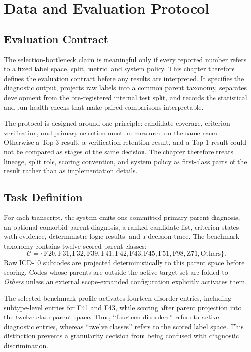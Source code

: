 \chapter{Data and Evaluation Protocol}
\label{ch:data}

\section{Evaluation Contract}

The selection-bottleneck claim is meaningful only if every reported number refers to a fixed label space, split, metric, and system policy. This chapter therefore defines the evaluation contract before any results are interpreted. It specifies the diagnostic output, projects raw labels into a common parent taxonomy, separates development from the pre-registered internal test split, and records the statistical and run-health checks that make paired comparisons interpretable.

The protocol is designed around one principle: candidate coverage, criterion verification, and primary selection must be measured on the same cases. Otherwise a Top-3 result, a verification-retention result, and a Top-1 result could not be compared as stages of the same decision. The chapter therefore treats lineage, split role, scoring convention, and system policy as first-class parts of the result rather than as implementation details.

\section{Task Definition}

For each transcript, the system emits one committed primary parent diagnosis, an optional comorbid parent diagnosis, a ranked candidate list, criterion states with evidence, deterministic logic results, and a decision trace. The benchmark taxonomy contains twelve scored parent classes:
\[
\mathcal{C}=\{\mathrm{F20},\mathrm{F31},\mathrm{F32},\mathrm{F39},\mathrm{F41},
\mathrm{F42},\mathrm{F43},\mathrm{F45},\mathrm{F51},\mathrm{F98},
\mathrm{Z71},\mathrm{Others}\}.
\]
Raw ICD-10 subcodes are projected deterministically to this parent space before scoring. Codes whose parents are outside the active target set are folded to \emph{Others} unless an external scope-expanded configuration explicitly activates them.

The selected benchmark profile activates fourteen disorder entries, including subtype-level entries for F41 and F43, while scoring after parent projection into the twelve-class parent space. Thus, ``fourteen disorders'' refers to active diagnostic entries, whereas ``twelve classes'' refers to the scored label space. This distinction prevents a granularity decision from being confused with diagnostic discrimination.

